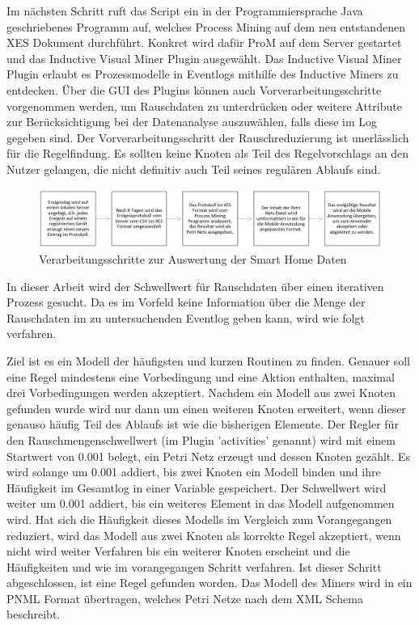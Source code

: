 Im nächsten Schritt ruft das Script ein in der Programmiersprache Java geschriebenes Programm auf, welches Process Mining auf dem neu entstandenen XES Dokument durchführt. Konkret wird dafür ProM auf dem Server gestartet und das Inductive Visual Miner Plugin ausgewählt.
Das Inductive Visual Miner Plugin erlaubt es Prozessmodelle in Eventlogs mithilfe des Inductive Miners zu entdecken. Über die GUI des Plugins können auch Vorverarbeitungsschritte vorgenommen werden, um Rauschdaten zu unterdrücken oder weitere Attribute zur Berücksichtigung bei der Datenanalyse auszuwählen, falls diese im Log gegeben sind. Der Vorverarbeitungsschritt der Rauschreduzierung ist unerlässlich für die Regelfindung. Es sollten keine Knoten als Teil des Regelvorschlags an den Nutzer gelangen, die nicht definitiv auch Teil seines regulären Ablaufs sind. 

\begin{figure}[!h]
    \centering
    \includegraphics[width=1.2\textwidth,origin=c]{figures/Appbildungen/pipeline.PNG}
    \caption{Verarbeitungsschritte zur Auswertung der Smart Home Daten}
    \label{fig:4}
\end{figure}

In dieser Arbeit wird der Schwellwert für Rauschdaten über einen iterativen Prozess gesucht. Da es im Vorfeld keine Information über die Menge der Rauschdaten im zu untersuchenden Eventlog geben kann, wird wie folgt verfahren. 

Ziel ist es ein Modell der häufigsten und kurzen Routinen zu finden. Genauer soll eine Regel mindestens eine Vorbedingung und eine Aktion enthalten, maximal drei Vorbedingungen werden akzeptiert. Nachdem ein Modell aus zwei Knoten gefunden wurde wird nur dann um einen weiteren Knoten erweitert, wenn dieser genauso häufig Teil des Ablaufs ist wie die bisherigen Elemente. Der Regler für den Rauschmengenschwellwert (im Plugin 'activities' genannt) wird mit einem Startwert von 0.001 belegt, ein Petri Netz erzeugt und dessen Knoten gezählt. Es wird solange um 0.001 addiert, bis zwei Knoten ein Modell binden und ihre Häufigkeit im Gesamtlog in einer Variable gespeichert. Der Schwellwert wird weiter um 0.001 addiert, bis ein weiteres Element in das Modell aufgenommen wird. Hat sich die Häufigkeit dieses Modells im Vergleich zum Vorangegangen reduziert, wird das Modell aus zwei Knoten als korrekte Regel akzeptiert, wenn nicht wird weiter Verfahren bis ein weiterer Knoten erscheint und die Häufigkeiten und wie im vorangegangen Schritt verfahren.
Ist dieser Schritt abgeschlossen, ist eine Regel gefunden worden.
Das Modell des Miners wird in ein PNML Format übertragen, welches Petri Netze nach dem XML Schema beschreibt.

